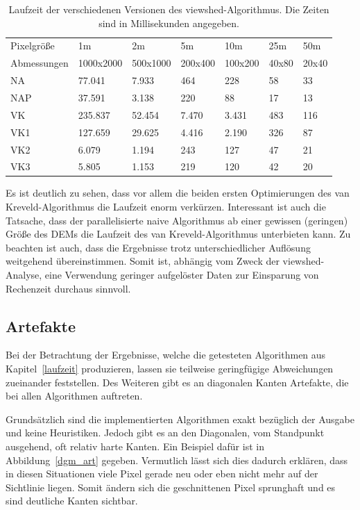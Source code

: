 \begin{table}[!ht]
\centering
\begin{tabular}{|C{2cm}|R{1.6cm}|R{1.6cm}|R{1.6cm}|R{1.6cm}|R{1.6cm}|R{1.6cm}|}
\hline
Pixelgröße & 1m & 2m & 5m & 10m & 25m & 50m \\ 
Abmessungen & 1000x2000 & 500x1000 & 200x400 & 100x200 & 40x80 & 20x40 \\ \hline
NA & 77.041 & 7.933 & 464 & 228 & 58 & 33 \\ \hline
NAP & 37.591 & 3.138 & 220 & 88 & 17 & 13 \\ \hline
VK & 235.837 & 52.454 & 7.470 & 3.431 & 483 & 116 \\ \hline
VK1 & 127.659 & 29.625 & 4.416 & 2.190 & 326 & 87 \\ \hline
VK2 & 6.079 & 1.194 & 243 & 127 & 47 & 21 \\ \hline
VK3 & 5.805 & 1.153 & 219 & 120 & 42 & 20 \\ \hline
\end{tabular}
\caption{Laufzeit der verschiedenen Versionen des viewshed-Algorithmus. Die Zeiten sind in Millisekunden angegeben.}
\label{runtimes}
\end{table}

Es ist deutlich zu sehen, dass vor allem die beiden ersten Optimierungen des van Kreveld-Algorithmus die Laufzeit enorm verkürzen. Interessant ist 
auch die Tatsache, dass der parallelisierte naive Algorithmus ab einer gewissen (geringen) Größe des DEMs die Laufzeit des van Kreveld-Algorithmus unterbieten 
kann. 
Zu beachten ist auch, dass die Ergebnisse trotz unterschiedlicher Auflösung weitgehend übereinstimmen. Somit ist, abhängig vom Zweck der viewshed-Analyse, eine Verwendung geringer aufgelöster Daten zur Einsparung von Rechenzeit durchaus sinnvoll. 

\subsection{Artefakte}
Bei der Betrachtung der Ergebnisse, welche die getesteten Algorithmen aus Kapitel~\ref{laufzeit} produzieren, lassen sie teilweise geringfügige Abweichungen zueinander feststellen. 
Des Weiteren gibt es an diagonalen Kanten Artefakte, die bei allen Algorithmen auftreten. 



Grundsätzlich sind die implementierten Algorithmen exakt bezüglich der Ausgabe und keine Heuristiken. 
Jedoch gibt es an den Diagonalen, vom Standpunkt ausgehend, oft relativ harte Kanten. 
Ein Beispiel dafür ist in Abbildung~\ref{dgm_art} gegeben. 
Vermutlich lässt sich dies dadurch erklären, dass in diesen Situationen viele Pixel gerade neu oder eben nicht mehr auf der Sichtlinie liegen. 
Somit ändern sich die geschnittenen Pixel sprunghaft und es sind deutliche Kanten sichtbar. 



